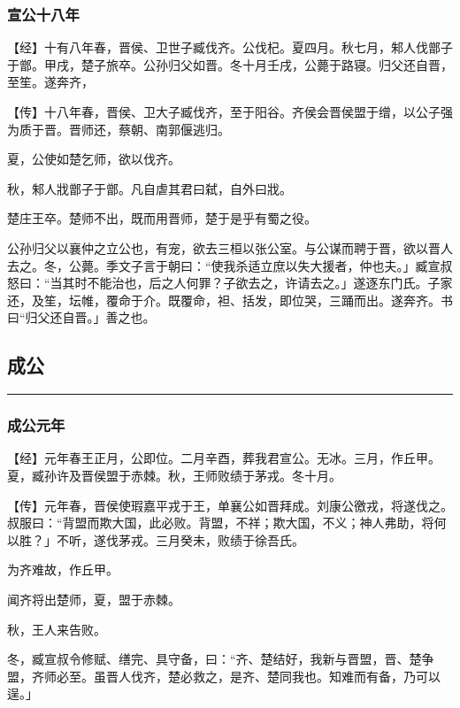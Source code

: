 \documentclass[]{article}
\begin{document}
\hypertarget{header-n1500}{%
\subsubsection{宣公十八年}\label{header-n1500}}

【经】十有八年春，晋侯、卫世子臧伐齐。公伐杞。夏四月。秋七月，邾人伐鄫子于鄫。甲戌，楚子旅卒。公孙归父如晋。冬十月壬戌，公薨于路寝。归父还自晋，至笙。遂奔齐，

【传】十八年春，晋侯、卫大子臧伐齐，至于阳谷。齐侯会晋侯盟于缯，以公子强为质于晋。晋师还，蔡朝、南郭偃逃归。

夏，公使如楚乞师，欲以伐齐。

秋，邾人戕鄫子于鄫。凡自虐其君曰弑，自外曰戕。

楚庄王卒。楚师不出，既而用晋师，楚于是乎有蜀之役。

公孙归父以襄仲之立公也，有宠，欲去三桓以张公室。与公谋而聘于晋，欲以晋人去之。冬，公薨。季文子言于朝曰：``使我杀适立庶以失大援者，仲也夫。」臧宣叔怒曰：``当其时不能治也，后之人何罪？子欲去之，许请去之。」遂逐东门氏。子家还，及笙，坛帷，覆命于介。既覆命，袒、括发，即位哭，三踊而出。遂奔齐。书曰``归父还自晋。」善之也。

\hypertarget{header-n1508}{%
\subsection{成公}\label{header-n1508}}

\begin{center}\rule{0.5\linewidth}{\linethickness}\end{center}

\hypertarget{header-n1510}{%
\subsubsection{成公元年}\label{header-n1510}}

【经】元年春王正月，公即位。二月辛酉，葬我君宣公。无冰。三月，作丘甲。夏，臧孙许及晋侯盟于赤棘。秋，王师败绩于茅戎。冬十月。

【传】元年春，晋侯使瑕嘉平戎于王，单襄公如晋拜成。刘康公徼戎，将遂伐之。叔服曰：``背盟而欺大国，此必败。背盟，不祥；欺大国，不义；神人弗助，将何以胜？」不听，遂伐茅戎。三月癸未，败绩于徐吾氏。

为齐难故，作丘甲。

闻齐将出楚师，夏，盟于赤棘。

秋，王人来告败。

冬，臧宣叔令修赋、缮完、具守备，曰：``齐、楚结好，我新与晋盟，晋、楚争盟，齐师必至。虽晋人伐齐，楚必救之，是齐、楚同我也。知难而有备，乃可以逞。」
\end{document}
